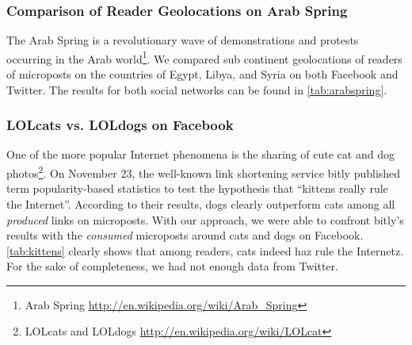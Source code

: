 \documentclass{iosart2c}
\begin{document}
\subsubsection{Comparison of Reader Geolocations on Arab Spring}
The Arab Spring is a revolutionary wave of demonstrations and protests occurring in the Arab world\footnote{Arab Spring \url{http://en.wikipedia.org/wiki/Arab\_Spring}}.
We compared sub continent geolocations of readers of microposts on the countries of Egypt, Libya, and Syria on both Facebook and Twitter.
The results for both social networks can be found in \autoref{tab:arabspring}.

\begin{table}
  \centering
  \qquad
    \caption{Sub continent geolocations of reader interest of some of the Arab Spring key countries (May~1 -- November~12).}
  \label{tab:arabspring}
\end{table}

\subsubsection{LOLcats vs. LOLdogs on Facebook}
One of the more popular Internet phenomena is the sharing of cute cat and dog photos\footnote{LOLcats and LOLdogs \url{http://en.wikipedia.org/wiki/LOLcat}}.
On November 23, the well-known link shortening service bitly published term popularity-based statistics to test the hypothesis that ``kittens really rule the Internet''.
According to their results, dogs clearly outperform cats among all \emph{produced} links on microposts.
With our approach, we were able to confront bitly's results with the \emph{consumed} microposts around cats and dogs on Facebook.
\autoref{tab:kittens} clearly shows that among readers, cats indeed haz rule the Internetz.
For the sake of completeness, we had not enough data from Twitter.
\end{document}
